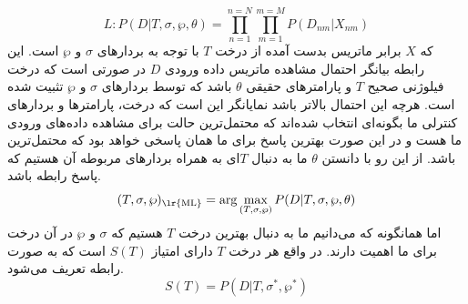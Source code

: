 \begin{equation}
	L: P(D|T,\sigma, \wp, \theta) = \prod_{n=1}^{n=N}\prod_{m=1}^{m=M}P(D_{nm}|X_{nm})
	\label{eq:ch_pm:pm1_likelihood}
\end{equation}
که $X$ برابر ماتریس بدست آمده از درخت $T$ با توجه به بردارهای $\sigma$ و $\wp$ است. این رابطه بیانگر احتمال مشاهده ماتریس داده ورودی $D$ در صورتی است که درخت فیلوژنی صحیح $T$ و پارامترهای حقیقی $\theta$ باشد که توسط بردارهای $\sigma$ و $\wp$ تثبیت شده است. هرچه این احتمال بالاتر باشد نمایانگر این است که درخت، پارامترها و بردارهای کنترلی ما بگونه‌ای انتخاب شده‌اند که محتمل‌ترین حالت برای مشاهده داده‌های ورودی ما هست و در این صورت بهترین پاسخ برای ما همان پاسخی خواهد بود که محتمل‌ترین باشد. از این رو با دانستن $\theta$ ما به دنبال $T$ای به همراه بردارهای مربوطه آن هستیم که پاسخ رابطه \label{eq:ch_pm:pm1_maxML} باشد.
\begin{equation}
	(T, \sigma, \wp)_{\text{\lr{ML}}} = \arg\max_{(T, \sigma, \wp)} P(D|T,\sigma, \wp, \theta)
	\label{eq:ch_pm:pm1_maxML}
\end{equation}
 اما همانگونه که می‌دانیم ما به دنبال بهترین درخت $T$ هستیم که $\sigma$ و $\wp$ در آن درخت برای ما اهمیت دارند. در واقع هر درخت $T$ دارای امتیاز $S(T)$ است که به صورت رابطه \label{eq:ch_pm:pm1_sT} تعریف می‌شود.
 \begin{equation}
 	S(T) = P(D|T,\sigma^*, \wp^*)
 	\label{eq:ch_pm:pm1_sT}
 \end{equation}

